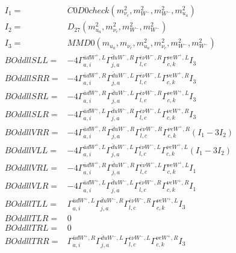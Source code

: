 \documentclass[A4,landscape]{article}
\begin{document}
\begin{align} 
I_1 = & C0D0check(m^2_{\nu_{{c}}}, m^2_{W^-}, m^2_{W^-}, m^2_{u_{{a}}}) \\ 
I_2 = & D_{27}(m^2_{u_{{a}}}, m^2_{\nu_{{c}}}, m^2_{W^-}, m^2_{W^-}) \\ 
I_3 = & MMD0(m_{u_{{a}}}, m_{\nu_{{c}}}, m^2_{u_{{a}}}, m^2_{\nu_{{c}}}, m^2_{W^-}, m^2_{W^-}) \\ 
  BOddllSLL= & -4  \Gamma^{\bar{u}d W^+,L}_{a, i} \Gamma^{\bar{d}u W^- ,R}_{j, a} \Gamma^{\bar{e}\nu W^- ,R}_{l, c} \Gamma^{\nu e W^+,L}_{c, k} I_3 \\ 
  BOddllSRR= & -4  \Gamma^{\bar{u}d W^+,R}_{a, i} \Gamma^{\bar{d}u W^- ,L}_{j, a} \Gamma^{\bar{e}\nu W^- ,L}_{l, c} \Gamma^{\nu e W^+,R}_{c, k} I_3 \\ 
  BOddllSRL= & -4  \Gamma^{\bar{u}d W^+,R}_{a, i} \Gamma^{\bar{d}u W^- ,L}_{j, a} \Gamma^{\bar{e}\nu W^- ,R}_{l, c} \Gamma^{\nu e W^+,L}_{c, k} I_3 \\ 
  BOddllSLR= & -4  \Gamma^{\bar{u}d W^+,L}_{a, i} \Gamma^{\bar{d}u W^- ,R}_{j, a} \Gamma^{\bar{e}\nu W^- ,L}_{l, c} \Gamma^{\nu e W^+,R}_{c, k} I_3 \\ 
  BOddllVRR= & -4  \Gamma^{\bar{u}d W^+,R}_{a, i} \Gamma^{\bar{d}u W^- ,R}_{j, a} \Gamma^{\bar{e}\nu W^- ,R}_{l, c} \Gamma^{\nu e W^+,R}_{c, k} (I_1 - 3 I_2) \\ 
  BOddllVLL= & -4  \Gamma^{\bar{u}d W^+,L}_{a, i} \Gamma^{\bar{d}u W^- ,L}_{j, a} \Gamma^{\bar{e}\nu W^- ,L}_{l, c} \Gamma^{\nu e W^+,L}_{c, k} (I_1 - 3 I_2) \\ 
  BOddllVRL= & -4  \Gamma^{\bar{u}d W^+,R}_{a, i} \Gamma^{\bar{d}u W^- ,R}_{j, a} \Gamma^{\bar{e}\nu W^- ,L}_{l, c} \Gamma^{\nu e W^+,L}_{c, k} I_1 \\ 
  BOddllVLR= & -4  \Gamma^{\bar{u}d W^+,L}_{a, i} \Gamma^{\bar{d}u W^- ,L}_{j, a} \Gamma^{\bar{e}\nu W^- ,R}_{l, c} \Gamma^{\nu e W^+,R}_{c, k} I_1 \\ 
  BOddllTLL= &  \Gamma^{\bar{u}d W^+,L}_{a, i} \Gamma^{\bar{d}u W^- ,R}_{j, a} \Gamma^{\bar{e}\nu W^- ,R}_{l, c} \Gamma^{\nu e W^+,L}_{c, k} I_3 \\ 
  BOddllTLR= & 0 \\ 
  BOddllTRL= & 0 \\ 
  BOddllTRR= &  \Gamma^{\bar{u}d W^+,R}_{a, i} \Gamma^{\bar{d}u W^- ,L}_{j, a} \Gamma^{\bar{e}\nu W^- ,L}_{l, c} \Gamma^{\nu e W^+,R}_{c, k} I_3 \\ 
\end{align} 
\end{document}
